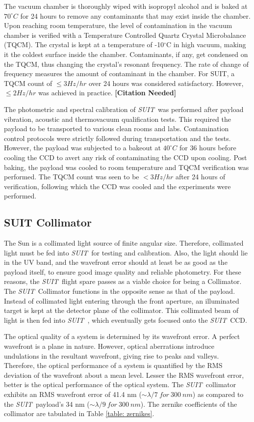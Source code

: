 \documentclass[12pt]{spieman}  %
\newcommand{\suit}{{\it SUIT~}}
\newcommand{\degree}{$^{\circ}$}
\newcommand{\js}[1]{{\bf\color{magenta} [#1]}}
\begin{document}
The vacuum chamber is thoroughly wiped with isopropyl alcohol and is baked at  $70^\circ C$ for 24 hours to remove any contaminants that may exist inside the chamber. Upon reaching room temperature, the level of contamination in the vacuum chamber is verified with a Temperature Controlled Quartz Crystal Microbalance (TQCM). The crystal is kept at a temperature of -10\degree C in high vacuum, making it the coldest surface inside the chamber. Contaminants, if any, get condensed on the TQCM, thus changing the crystal's resonant frequency. The rate of change of frequency measures the amount of contaminant in the chamber. For SUIT, a TQCM count of $\leq 3 Hz/hr$ over 24 hours was considered satisfactory. However, $\leq 2 Hz/hr$ was achieved in practice. \js{Citation Needed}

The photometric and spectral calibration of \suit was performed after payload vibration, acoustic and thermovacuum qualification tests. This required the payload to be transported to various clean rooms and labs. Contamination control protocols were strictly followed during transportation and the tests. However, the payload was subjected to a bakeout at $40 ^\circ C$ for 36 hours before cooling the CCD to avert any risk of contaminating the CCD upon cooling. Post baking, the payload was cooled to room temperature and TQCM verification was performed. The TQCM count was seen to be $< 3 Hz/hr$ after 24 hours of verification, following which the CCD was cooled and the experiments were performed.
 
\subsection{SUIT Collimator}		
The Sun is a collimated light source of finite angular size. Therefore, collimated light must be fed into \suit for testing and calibration. Also, the light should lie in the UV band, and the wavefront error should at least be as good as the payload itself, to ensure good image quality and reliable photometry. For these reasons, the \suit flight spare passes as a viable choice for being a Collimator. The \suit Collimator functions in the opposite sense as that of the payload. Instead of collimated light entering through the front aperture, an illuminated target is kept at the  detector plane of the collimator. This collimated beam of light is then fed into \suit, which eventually gets focused onto the \suit CCD.
	
The optical quality of a system is determined by its wavefront error. A perfect wavefront is a plane in nature. However, optical aberrations introduce undulations in the resultant wavefront, giving rise to peaks and valleys. Therefore, the optical performance of a system is quantified by the RMS deviation of the wavefront about a mean level. Lesser the RMS wavefront error, better is the optical performance of the optical system. The \suit collimator exhibits an RMS wavefront error of 41.4 nm ($\sim \lambda/7 ~ for ~ 300~ nm$) as compared to the \suit payload's 34 nm ($\sim \lambda/9 ~ for ~ 300~ nm$). The zernike coefficients of the collimator are tabulated in Table \ref{table: zernikes}.
\end{document}
